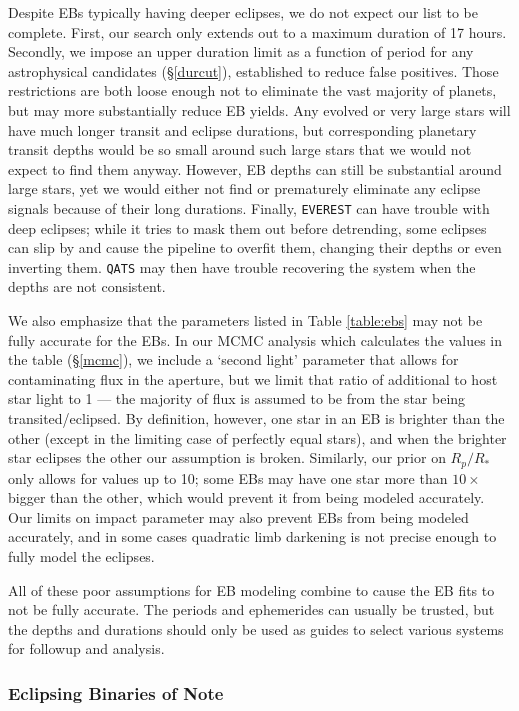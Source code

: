 \documentclass[twocolumn]{aastex62}
\newcommand{\pipeline}[1]{\texttt{#1}}
\begin{document}
Despite EBs typically having deeper eclipses, we do not expect our
list to be complete. First, our search only extends out to a maximum
duration of 17 hours. Secondly, we impose an upper duration limit as a
function of period for any astrophysical candidates (\S\ref{durcut}),
established to reduce false positives. Those restrictions are both
loose enough not to eliminate the vast majority of planets, but may
more substantially reduce EB yields. Any evolved or very large stars
will have much longer transit and eclipse durations, but corresponding
planetary transit depths would be so small around such large stars
that we would not expect to find them anyway. However, EB depths can
still be substantial around large stars, yet we would either not find
or prematurely eliminate any eclipse signals because of their long
durations. Finally, \pipeline{EVEREST} can have trouble with deep
eclipses; while it tries to mask them out before detrending, some
eclipses can slip by and cause the pipeline to overfit them, changing
their depths or even inverting them. \pipeline{QATS} may then have
trouble recovering the system when the depths are not consistent.

We also emphasize that the parameters listed in Table \ref{table:ebs}
may not be fully accurate for the EBs. In our MCMC analysis which
calculates the values in the table (\S\ref{mcmc}), we include a
`second light' parameter that allows for contaminating flux in the
aperture, but we limit that ratio of additional to host star light to
1 --- the majority of flux is assumed to be from the star being
transited/eclipsed. By definition, however, one star in an EB is
brighter than the other (except in the limiting case of perfectly
equal stars), and when the brighter star eclipses the other our
assumption is broken. Similarly, our prior on $R_p/R_*$ only allows
for values up to 10; some EBs may have one star more than $10\times$
bigger than the other, which would prevent it from being modeled
accurately. Our limits on impact parameter may also prevent EBs from
being modeled accurately, and in some cases quadratic limb darkening
is not precise enough to fully model the eclipses.

All of these poor assumptions for EB modeling combine to cause the EB
fits to not be fully accurate. The periods and ephemerides can usually
be trusted, but the depths and durations should only be used as guides
to select various systems for followup and analysis.


\subsubsection{Eclipsing Binaries of Note}
\label{ebnotes}
\end{document}
